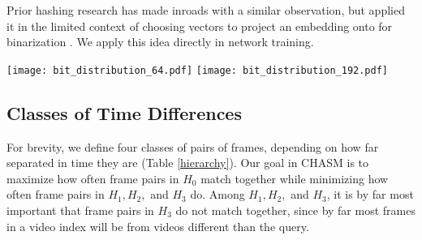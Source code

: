 \documentclass{article}
\renewenvironment{figure}{\par\medskip\noindent\minipage{\linewidth}}{\endminipage\par\medskip}
\begin{document}
\begin{multicols}{2}
\begin{figure}
\begin{center}
\end{center}
\label{sphere}
\end{figure}


Prior hashing research has made inroads with a similar observation, but applied it in the limited context of choosing vectors to project an embedding onto for binarization \cite{binomial16}. We apply this idea directly in network training.

\begin{figure*}
\label{distributions}
\begin{center}
\texttt{[image: bit\_distribution\_64.pdf]}
\texttt{[image: bit\_distribution\_192.pdf]}
\end{center}
\end{figure*}

\subsection{Classes of Time Differences}

For brevity, we define four classes of pairs of frames, depending on how far separated in time they are (Table \ref{hierarchy}). Our goal in CHASM is to maximize how often frame pairs in $H_0$ match together while minimizing how often frame pairs in $H_1, H_2,$ and $H_3$ do. Among $H_1, H_2,$ and $H_3$, it is by far most important that frame pairs in $H_3$ do not match together, since by far most frames in a video index will be from videos different than the query.


\end{multicols}
\end{document}
